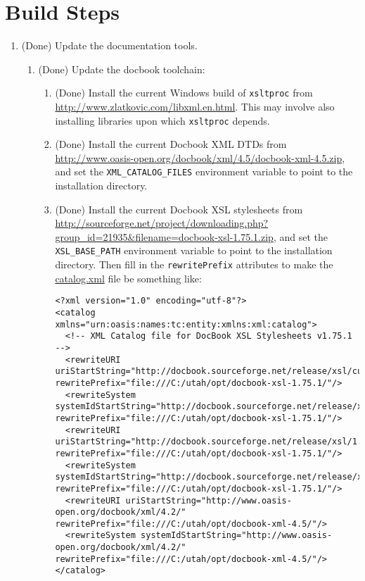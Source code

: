\documentclass[11pt,letterpaper,onecolumn]{scrartcl}
\begin{document}
\begin{sloppypar}
\section{Build Steps}
\label{sec:BuildSteps}

\begin{enumerate}
	\item (Done) Update the documentation tools.
		\begin{enumerate}
	    \item (Done) Update the docbook toolchain:
				\begin{enumerate}
					\item (Done) Install the current Windows build of \texttt{xsltproc} from \url{http://www.zlatkovic.com/libxml.en.html}. This may involve also installing libraries upon which \texttt{xsltproc} depends.
					\item (Done) Install the current Docbook XML DTDs from \url{http://www.oasis-open.org/docbook/xml/4.5/docbook-xml-4.5.zip}, and set the \verb|XML_CATALOG_FILES| environment variable to point to the installation directory.
					\item (Done) Install the current Docbook XSL stylesheets from \url{http://sourceforge.net/project/downloading.php?group_id=21935&filename=docbook-xsl-1.75.1.zip}, and set the \verb|XSL_BASE_PATH| environment variable to point to the installation directory. Then fill in the \texttt{rewritePrefix} attributes to make the \url{catalog.xml} file be something like:
					\begin{lstlisting}
<?xml version="1.0" encoding="utf-8"?>
<catalog xmlns="urn:oasis:names:tc:entity:xmlns:xml:catalog">
  <!-- XML Catalog file for DocBook XSL Stylesheets v1.75.1 -->
  <rewriteURI uriStartString="http://docbook.sourceforge.net/release/xsl/current/" rewritePrefix="file:///C:/utah/opt/docbook-xsl-1.75.1/"/>
  <rewriteSystem systemIdStartString="http://docbook.sourceforge.net/release/xsl/current/" rewritePrefix="file:///C:/utah/opt/docbook-xsl-1.75.1/"/>
  <rewriteURI uriStartString="http://docbook.sourceforge.net/release/xsl/1.75.1/" rewritePrefix="file:///C:/utah/opt/docbook-xsl-1.75.1/"/>
  <rewriteSystem systemIdStartString="http://docbook.sourceforge.net/release/xsl/1.75.1/" rewritePrefix="file:///C:/utah/opt/docbook-xsl-1.75.1/"/>
  <rewriteURI uriStartString="http://www.oasis-open.org/docbook/xml/4.2/" rewritePrefix="file:///C:/utah/opt/docbook-xml-4.5/"/>
  <rewriteSystem systemIdStartString="http://www.oasis-open.org/docbook/xml/4.2/" rewritePrefix="file:///C:/utah/opt/docbook-xml-4.5/"/>
</catalog>
					\end{lstlisting}
				\end{enumerate}


\end{enumerate}
\end{enumerate}
\end{sloppypar}
\end{document}
